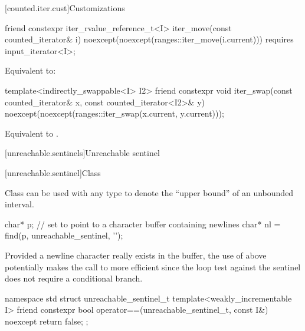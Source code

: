 [counted.iter.cust]{Customizations}

%
\begin{itemdecl}
friend constexpr iter_rvalue_reference_t<I>
  iter_move(const counted_iterator& i)
    noexcept(noexcept(ranges::iter_move(i.current)))
    requires input_iterator<I>;
\end{itemdecl}

\begin{itemdescr}
\pnum
\effects
Equivalent to: 
\end{itemdescr}

%
\begin{itemdecl}
template<indirectly_swappable<I> I2>
  friend constexpr void
    iter_swap(const counted_iterator& x, const counted_iterator<I2>& y)
      noexcept(noexcept(ranges::iter_swap(x.current, y.current)));
\end{itemdecl}

\begin{itemdescr}
\pnum
\effects
Equivalent to .
\end{itemdescr}

[unreachable.sentinels]{Unreachable sentinel}

[unreachable.sentinel]{Class }

%
\pnum
Class  can be used with
any  type
to denote the ``upper bound'' of an unbounded interval.

\pnum
\begin{example}
\begin{codeblock}
char* p;
// set  to point to a character buffer containing newlines
char* nl = find(p, unreachable_sentinel, '\n');
\end{codeblock}

Provided a newline character really exists in the buffer, the use of
 above potentially makes the call to  more
efficient since the loop test against the sentinel does not require a
conditional branch.
\end{example}

%
\begin{codeblock}
namespace std {
  struct unreachable_sentinel_t {
    template<weakly_incrementable I>
      friend constexpr bool operator==(unreachable_sentinel_t, const I&) noexcept
      { return false; }
  };
}
\end{codeblock}

